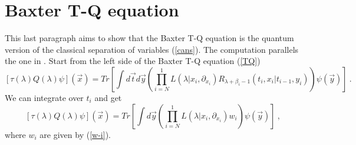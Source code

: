 \documentclass[a4paper,11pt]{article}
\begin{document}
\section{Baxter T-Q equation}
This last paragraph aims to show that the Baxter T-Q equation is the quantum
version of the classical separation of variables (\ref{cans}). The
computation parallels the one in \cite{Sky}. Start from the left side of the
Baxter T-Q equation (\ref{TQ})
\begin{equation}
\label{TQ1}
[\tau(\lambda )Q(\lambda)\psi]({\vec x})=Tr\left[\int d{\vec t}d{\vec y}
    \left(\prod_{i=N}^1 L(\lambda|x_i,\partial_{x_i})
    R_{\lambda +\beta_i-1}(t_i,x_i|t_{i-1},y_i)\right)\psi({\vec y})\right] ~.
\end{equation}
We can integrate over $t_i$ and get
\begin{equation}
\label{Tq2}
[\tau(\lambda )Q(\lambda)\psi]({\vec x})=Tr\left[\int d{\vec y}
     \left(\prod_{i=N}^1 L(\lambda|x_i,\partial_{x_i}) w_i\right)
     \psi({\vec y})\right] ~,
\end{equation}
where $w_i$ are given by (\ref{w-i}).
\end{document}

